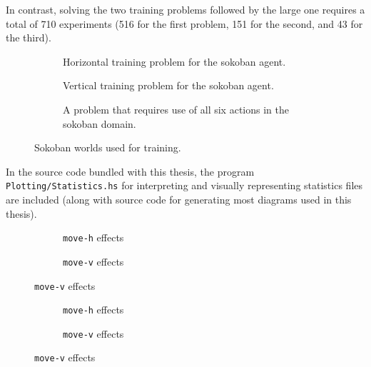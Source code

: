 \documentclass[../Master.tex]{subfiles}
\providecommand{\master}{..}
\begin{document}
In contrast, solving the two training problems followed by the large one requires a total of 710 experiments (516 for the first problem, 151 for the second, and 43 for the third).

\begin{figure}
    \begin{subfigure}{0.3\textwidth}
        \resizebox{\linewidth}{!}{}
        \caption{Horizontal training problem for the sokoban agent.}\label{fig:results:train1}
    \end{subfigure}
    \begin{subfigure}{0.3\textwidth}
        \resizebox{\linewidth}{!}{}
        \caption{Vertical training problem for the sokoban agent.}\label{fig:results:train2}
    \end{subfigure}
    \begin{subfigure}{0.3\textwidth}
        \resizebox{\linewidth}{!}{}
        \caption{A problem that requires use of all six actions in the sokoban domain.}\label{fig:results:train3}
    \end{subfigure}
    \caption{Sokoban worlds used for training.}\label{fig:results:sokoTraining}
\end{figure}

In the source code bundled with this thesis, the program \texttt{Plotting/Statistics.hs} for interpreting and visually representing statistics files are included  (along with source code for generating most diagrams used in this thesis). 

\begin{figure}
    \centering
    \begin{subfigure}{0.45\linewidth}
        \resizebox{\linewidth}{!}{}
        \caption{\texttt{move-h} effects}\label{fig:res:ekmoveh}
    \end{subfigure}
    \begin{subfigure}{0.45\linewidth}
        \resizebox{\linewidth}{!}{}
        \caption{\texttt{move-v} effects}\label{fig:res:ekmovev}
    \end{subfigure}
\end{figure}

\begin{figure}
    \centering
    \begin{subfigure}{0.42\linewidth}
        \resizebox{\linewidth}{!}{}
        \caption{\texttt{move-h} effects}\label{fig:res:pkmoveh}
    \end{subfigure}
    \begin{subfigure}{0.42\linewidth}
        \resizebox{\linewidth}{!}{}
        \caption{\texttt{move-v} effects}\label{fig:res:pkmovev}
    \end{subfigure}
\end{figure}
\end{document}
